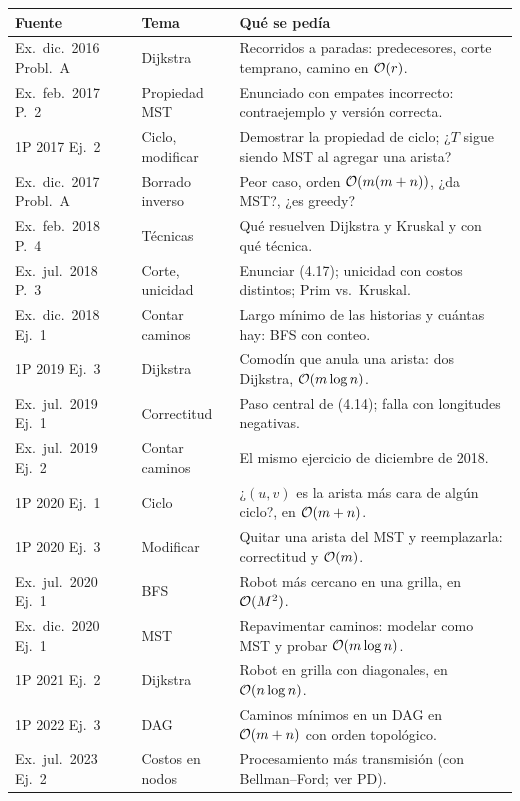 \begin{center}
\small
\begin{tabularx}{\textwidth}{@{}>{\raggedright\arraybackslash}p{2.8cm}>{\raggedright\arraybackslash}p{2.4cm}>{\raggedright\arraybackslash}X@{}}
\toprule
Fuente & Tema & Qué se pedía \\
\midrule
Ex.\ dic.~2016 Probl.~A & Dijkstra & Recorridos a paradas: predecesores, corte temprano, camino en $\mathcal{O}(r)$. \\
Ex.\ feb.~2017 P.~2 & Propiedad MST & Enunciado con empates incorrecto: contraejemplo y versión correcta. \\
1P 2017 Ej.~2 & Ciclo, modificar & Demostrar la propiedad de ciclo; ¿$T$ sigue siendo MST al agregar una arista? \\
Ex.\ dic.~2017 Probl.~A & Borrado inverso & Peor caso, orden $\mathcal{O}(m(m+n))$, ¿da MST?, ¿es greedy? \\
Ex.\ feb.~2018 P.~4 & Técnicas & Qué resuelven Dijkstra y Kruskal y con qué técnica. \\
Ex.\ jul.~2018 P.~3 & Corte, unicidad & Enunciar (4.17); unicidad con costos distintos; Prim vs.\ Kruskal. \\
Ex.\ dic.~2018 Ej.~1 & Contar caminos & Largo mínimo de las historias y cuántas hay: BFS con conteo. \\
1P 2019 Ej.~3 & Dijkstra & Comodín que anula una arista: dos Dijkstra, $\mathcal{O}(m\log n)$. \\
Ex.\ jul.~2019 Ej.~1 & Correctitud & Paso central de (4.14); falla con longitudes negativas. \\
Ex.\ jul.~2019 Ej.~2 & Contar caminos & El mismo ejercicio de diciembre de 2018. \\
1P 2020 Ej.~1 & Ciclo & ¿$(u,v)$ es la arista más cara de algún ciclo?, en $\mathcal{O}(m+n)$. \\
1P 2020 Ej.~3 & Modificar & Quitar una arista del MST y reemplazarla: correctitud y $\mathcal{O}(m)$. \\
Ex.\ jul.~2020 Ej.~1 & BFS & Robot más cercano en una grilla, en $\mathcal{O}(M^2)$. \\
Ex.\ dic.~2020 Ej.~1 & MST & Repavimentar caminos: modelar como MST y probar $\mathcal{O}(m\log n)$. \\
1P 2021 Ej.~2 & Dijkstra & Robot en grilla con diagonales, en $\mathcal{O}(n\log n)$. \\
1P 2022 Ej.~3 & DAG & Caminos mínimos en un DAG en $\mathcal{O}(m+n)$ con orden topológico. \\
Ex.\ jul.~2023 Ej.~2 & Costos en nodos & Procesamiento más transmisión (con Bellman–Ford; ver PD). \\

\end{tabularx}
\end{center}
